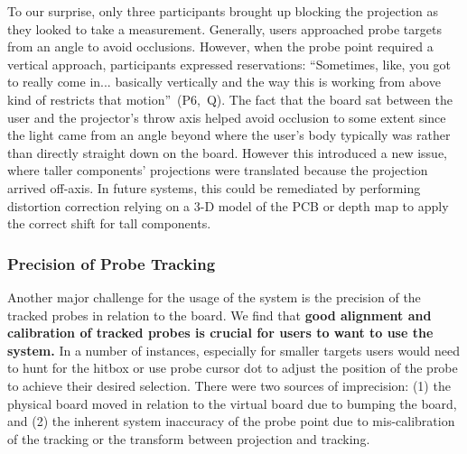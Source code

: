 \documentclass [11pt, proquest] {uwthesis}[2020/02/24]
\newcounter{sharc}
\newcommand{\sharcHere}[1]{Q\refstepcounter{sharc}\arabic{sharc}\label{#1}}
\begin{document}
To our surprise, only three participants brought up blocking the projection as they looked to take a measurement. Generally, users approached probe targets from an angle to avoid occlusions. However, when the probe point required a vertical approach, participants expressed reservations:
``Sometimes, like, you got to really come in... basically vertically and the way this is working from above kind of restricts that motion''~(P6,~\sharcHere{q:reservations}).
The fact that the board sat between the user and the projector's throw axis helped avoid occlusion to some extent since the light came from an angle beyond where the user's body typically was rather than directly straight down on the board.
However this introduced a new issue, where taller components' projections were translated because the projection arrived off-axis. In future systems, this could be remediated by performing distortion correction relying on a 3-D model of the PCB or depth map to apply the correct shift for tall components.











\subsubsection{Precision of Probe Tracking}

Another major challenge for the usage of the system is the precision of the tracked probes in relation to the board. We find that \textbf{good alignment and calibration of tracked probes is crucial for users to want to use the system.}
In a number of instances, especially for smaller targets users would need to hunt for the hitbox or use probe cursor dot to adjust the position of the probe to achieve their desired selection. There were two sources of imprecision: (1) the physical board moved in relation to the virtual board due to bumping the board, and (2) the inherent system inaccuracy of the probe point due to mis-calibration of the tracking or the transform between projection and tracking.
\end{document}
